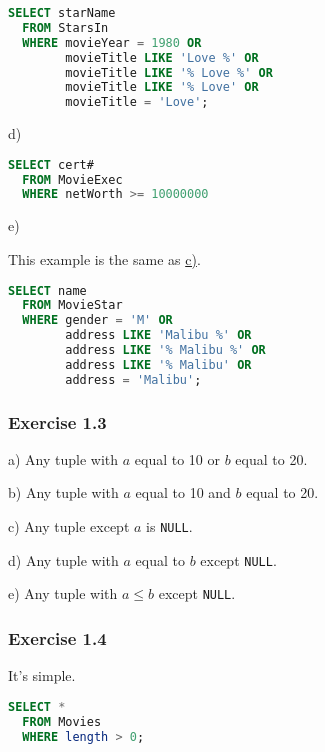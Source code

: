 \begin{lstlisting}[language=sql]
  SELECT starName
  FROM StarsIn
  WHERE movieYear = 1980 OR
        movieTitle LIKE 'Love %' OR
        movieTitle LIKE '% Love %' OR
        movieTitle LIKE '% Love' OR
        movieTitle = 'Love';
\end{lstlisting}

d)

\begin{lstlisting}[language=sql]
  SELECT cert#
  FROM MovieExec
  WHERE netWorth >= 10000000
\end{lstlisting}

e)

This example is the same as \hyperlink{Solution6.1.2c}{c)}.

\begin{lstlisting}[language=sql]
  SELECT name
  FROM MovieStar
  WHERE gender = 'M' OR
        address LIKE 'Malibu %' OR
        address LIKE '% Malibu %' OR
        address LIKE '% Malibu' OR
        address = 'Malibu';
\end{lstlisting}

\subsubsection*{Exercise 1.3}

a) Any tuple with $a$ equal to 10 or $b$ equal to 20.

b) Any tuple with $a$ equal to 10 and $b$ equal to 20.

c) Any tuple except $a$ is \verb|NULL|.

d) Any tuple with $a$ equal to $b$ except \verb|NULL|.

e) Any tuple with $a \leq b$ except \verb|NULL|.

\subsubsection*{Exercise 1.4}

It's simple.

\begin{lstlisting}[language=sql]
  SELECT *
  FROM Movies
  WHERE length > 0;
\end{lstlisting}
